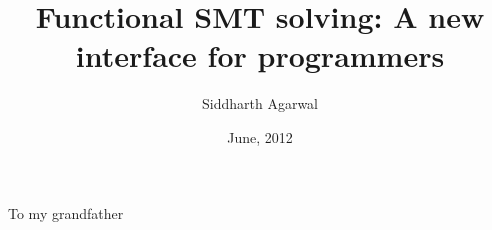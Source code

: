 

\clearpage{}  %



\title{Functional SMT solving: A new interface for programmers}
\author{Siddharth Agarwal}
\date{June, 2012}



\thesis



\maketitle

\makecertificate

\begin{dedication}
To my grandfather
\end{dedication}

